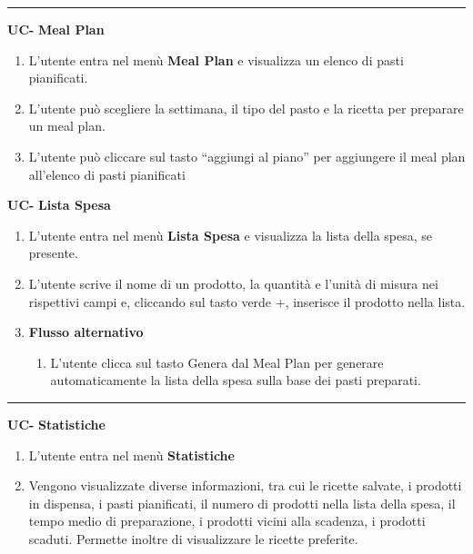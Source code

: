 \documentclass[a4paper, 12pt]{article}
\begin{document}
\vspace{0.5 cm}
\hrule
\vspace{0.5 cm}

{\large\textbf{UC-\count} \hspace{0.5 cm}   \textbf{Meal Plan}}
\begin{enumerate}[label=\arabic*.]
    \item L’utente entra nel menù \textbf{Meal Plan} e visualizza un elenco di pasti pianificati.
    \item L’utente può scegliere la settimana, il tipo del pasto e la ricetta per preparare un meal plan.
    \item L’utente può cliccare sul tasto “aggiungi al piano” per aggiungere il meal plan all’elenco di pasti pianificati
\end{enumerate}

\newpage

{\large\textbf{UC-\count} \hspace{0.5 cm}   \textbf{Lista Spesa}}
\begin{enumerate}[label=\arabic*.]
    \item L’utente entra nel menù \textbf{Lista Spesa} e visualizza la lista della spesa, se presente.
    \item L’utente scrive il nome di un prodotto, la quantità e l’unità di misura nei rispettivi campi e, cliccando sul tasto verde +, inserisce il prodotto nella lista.
    \item[] \textbf{Flusso alternativo}
    \begin{enumerate}
    \item[2a.] L’utente clicca sul tasto Genera dal Meal Plan per generare automaticamente la lista della spesa sulla base dei pasti preparati.
    \end{enumerate}
\end{enumerate}

\vspace{0.5 cm}
\hrule
\vspace{0.5 cm}

{\large\textbf{UC-\count} \hspace{0.5 cm}   \textbf{Statistiche}}
\begin{enumerate}[label=\arabic*.]
    \item L’utente entra nel menù \textbf{Statistiche}
    \item Vengono visualizzate diverse informazioni, tra cui le ricette salvate, i prodotti in dispensa, i pasti pianificati, il numero di prodotti nella lista della spesa, il tempo medio di preparazione, i prodotti vicini alla scadenza, i prodotti scaduti. Permette inoltre di visualizzare le ricette preferite.
\end{enumerate}
\end{document}
